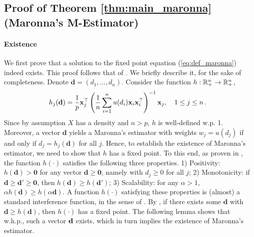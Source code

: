 \documentclass[times,sort&compress,3p]{elsarticle}
\begin{document}
   
\subsection{Proof of Theorem \ref{thm:main_maronna} (Maronna's M-Estimator)}
\label{sec:proof-thm:main_maronna}


\paragraph{Existence} 
We first prove that a solution to the fixed point equation (\ref{eq:def_maronna}) indeed exists. 
This proof follows that of  \cite{couillet2014robust}. We briefly describe it, for the sake of completeness.  
Denote  $\mathbf{d}=(d_1,\ldots,d_n)$. 
Consider the function $h:\mathbb{R}_+^n \to \mathbb{R}_+^n$,
\begin{equation}
        \label{eq:h_j}
h_j(\mathbf{d})=\frac1p {\bf x}_j^\top \left(\frac1n \sum_{i=1}^n u(d_i){\bf x}_i{\bf x}_i^\top \right)^{-1}{\bf x}_j ,\quad 1\le j \le n \,.
\end{equation}
Since by assumption $X$ has a density and $n>p$,
$h$ is well-defined w.p. 1.
Moreover, 
a vector $\bm{d}$ yields a Maronna's estimator with weights $w_j=u(d_j)$ if and only if $d_j=h_{j}(\mathbf{d})$ for all $j$. Hence, to establish the existence of Maronna's estimator, we need to show that $h$ 
has a fixed point. 
To this end, as proven in  \cite{couillet2014robust}, the function  $h(\cdot)$ satisfies the following three properties. 1) Positivity: $h(\mathbf{d})> \mathbf 0$ for any vector $\mathbf{d}\geq \mathbf0$, namely with $d_j\geq 0$ 
for all $j$; 2) Monotonicity: if $\mathbf{d}\geq \mathbf{d}'\geq \mathbf0$, then $h(\mathbf{d})\ge h(\mathbf{d}')$; 3) Scalability: for any $\alpha>1$, $\alpha h(\mathbf{d}) \ge h(\alpha \mathbf{d})$. 
 A function $h(\cdot)$ 
satisfying these properties
 is (almost) a standard interference function, in the sense of \cite{yates1995framework}. By \cite[Theorem 1]{yates1995framework}, 
 if there exists some $\mathbf{d}$ with $\mathbf{d}\geq h(\mathbf{d})$, then $h(\cdot)$ has a fixed point.
 The following lemma shows that w.h.p., such a vector ${\bf d}$ exists, which in turn implies the existence of Maronna's estimator.
\end{document}
